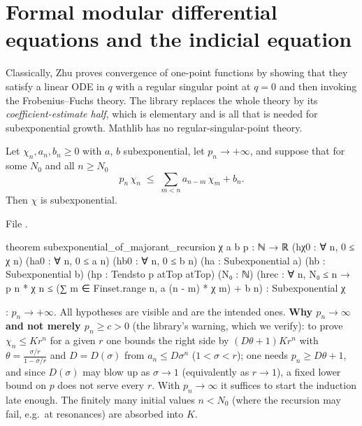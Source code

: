 \section{Formal modular differential equations and the indicial equation}\label{l14:sec:ode}

Classically, Zhu proves convergence of one-point functions by showing that they satisfy a linear ODE in $q$ with a regular
singular point at $q=0$ and then invoking the Frobenius--Fuchs theory. The library replaces the whole theory by its
\emph{coefficient-estimate half}, which is elementary and is all that is needed for subexponential growth. Mathlib has no
regular-singular-point theory.

\begin{theorem}\label{l14:thm:majorant}
Let $\chi_n, a_n, b_n\ge0$ with $a$, $b$ subexponential, let $p_n\to+\infty$, and suppose that for some $N_0$ and all $n\ge N_0$
\begin{equation*}
  p_n\,\chi_n \;\le\; \sum_{m<n}a_{n-m}\,\chi_m + b_n.
\end{equation*}
Then $\chi$ is subexponential.
\end{theorem}
\noindent File .
\begin{leancode}
theorem subexponential_of_majorant_recursion {χ a b p : ℕ → ℝ}
    (hχ0 : ∀ n, 0 ≤ χ n) (ha0 : ∀ n, 0 ≤ a n) (hb0 : ∀ n, 0 ≤ b n)
    (ha : Subexponential a) (hb : Subexponential b)
    (hp : Tendsto p atTop atTop) (N₀ : ℕ)
    (hrec : ∀ n, N₀ ≤ n → p n * χ n ≤ (∑ m ∈ Finset.range n, a (n - m) * χ m) + b n) :
    Subexponential χ
\end{leancode}
\begin{dictionary}
: $p_n\to+\infty$. All hypotheses are visible and are the intended ones. \textbf{Why $p_n\to\infty$
and not merely $p_n\ge c>0$} (the library's warning, which we verify): to prove $\chi_n\le Kr^n$ for a given $r$ one bounds the
right side by $(D\theta+1)Kr^n$ with $\theta = \frac{\sigma/r}{1-\sigma/r}$ and $D = D(\sigma)$ from $a_n\le D\sigma^n$
($1<\sigma<r$); one needs $p_n\ge D\theta+1$, and since $D(\sigma)$ may blow up as $\sigma\to1$ (equivalently as $r\to1$), a
fixed lower bound on $p$ does not serve every $r$. With $p_n\to\infty$ it suffices to start the induction late enough. The
finitely many initial values $n<N_0$ (where the recursion may fail, e.g.\ at resonances) are absorbed into $K$.
\end{dictionary}

